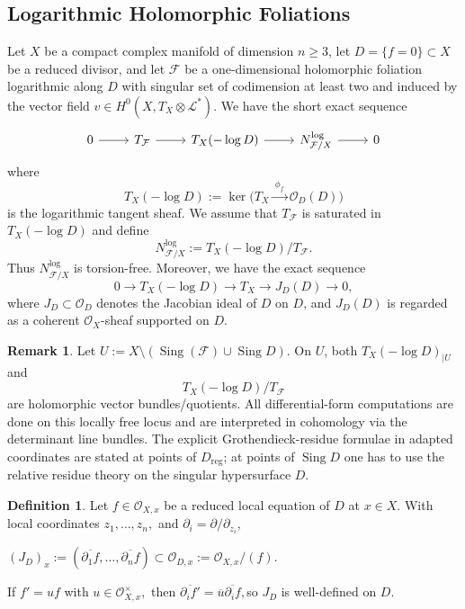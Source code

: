 \documentclass[12pt,reqno,a4paper]{amsart}
\numberwithin{equation}{section}
\theoremstyle{plain}
\theoremstyle{definition}
\newtheorem{definition}[definition]{Definition}
\newtheorem{remark}[remark]{Remark}
\DeclareMathOperator{\Sing}{Sing}
\newcommand{\cO}{\mathcal{O}}
\newcommand{\cF}{\mathcal{F}}
\begin{document}
\subsection{Logarithmic Holomorphic Foliations}
Let $X$ be a compact complex manifold of dimension $n \geq 3$, let $D=\{f=0\} \subset X$ be a reduced divisor, and let $\cF$ be a one-dimensional holomorphic foliation  logarithmic along $D$ with singular set of codimension at least two and induced by the vector field $v \in H^0(X, T_X \otimes \mathcal{L}^{\ast}).$ We have the short exact sequence 
\[
\begin{tikzcd}
0 \arrow[r] &
T_{\cF} \arrow[r] &
T_X(-\log D) \arrow[r] &
N_{\cF/X}^{\log} \arrow[r] &
0
\end{tikzcd}
\]
where
\[
T_X(-\log D):=\ker\bigl(T_X\xrightarrow{\ \phi_f\ }\cO_D(D)\bigr)
\]
is the logarithmic tangent sheaf. We assume that \(T_{\cF}\) is saturated in
\(T_X(-\log D)\) and define
\[
N_{\cF/X}^{\log}:=T_X(-\log D)/T_{\cF}.
\]
Thus \(N_{\cF/X}^{\log}\) is torsion-free.
Moreover, we have the exact sequence
\[
0\longrightarrow T_X(-\log D)
\longrightarrow T_X
\longrightarrow J_D(D)
\longrightarrow 0,
\]
where $J_D\subset \cO_D$ denotes the Jacobian ideal of $D$ on $D$, and
$J_D(D)$ is regarded as a coherent $\cO_X$-sheaf supported on $D$.


% 

 \begin{remark}
Let \(U := X \setminus (\Sing(\cF) \cup \Sing D)\).
On \(U\), both \(T_X(-\log D)_{|U}\) and $$T_X(-\log D)/T_{\cF}$$ are holomorphic vector bundles/quotients. All differential-form computations are done on this locally free locus and are interpreted in cohomology via the determinant line bundles. The explicit Grothendieck-residue formulae in adapted coordinates are stated at points of \(D_{\mathrm{reg}}\); at points of \(\Sing D\) one has to use the relative residue theory on the singular hypersurface \(D\).
 \end{remark}
 
\begin{definition} 
Let $f \in \cO_{X,x}$ be a reduced local equation of $D$ at $x \in X.$ With local coordinates $z_1, \ldots, z_n,$ and $\partial_i=\partial/\partial_{z_i},$
\begin{center}
$ (J_D)_x := (\overline{\partial_1 f}, \ldots, \overline{\partial_n f}) \subset \cO_{D,x} := \cO_{X,x}/(f).$
\end{center}
\end{definition}
If $f' = uf$ with $u \in \cO_{X,x}^{\times},$ then $\overline{\partial_i f'} = \overline{u} \overline{\partial_i f},$so $J_D$ is well-defined on $D.$
\end{document}
